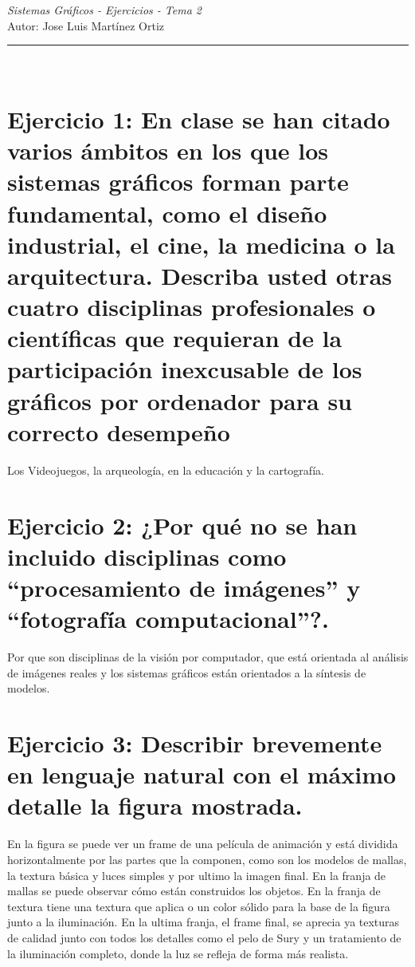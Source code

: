 \documentclass[10pt,a4paper,titlepage]{article}
\date{\normalsize\today} %
\newcommand{\horrule}[1]{\rule{\linewidth}{#1}} %
\begin{document}
\begin{center}
{\Huge \emph{Sistemas Gráficos - Ejercicios - Tema 2} } \\
\vspace{0.5cm}
Autor: Jose Luis Martínez Ortiz\\
\horrule{2pt} \\[0.5cm] %
\vspace{1.5cm}
\end{center}


\date{\normalsize\today} %


\section*{Ejercicio 1: En clase se han citado varios ámbitos en los que los sistemas gráficos forman parte
fundamental, como el diseño industrial, el cine, la medicina o la arquitectura. Describa usted
otras cuatro disciplinas profesionales o científicas que requieran de la participación
inexcusable de los gráficos por ordenador para su correcto desempeño}
Los Videojuegos, la arqueología, en la educación y la cartografía.

\section*{Ejercicio 2: ¿Por qué no se han incluido disciplinas como ``procesamiento de imágenes'' y ``fotografía computacional''?.}
Por que son disciplinas de la visión por computador, que está orientada al análisis de imágenes reales y los sistemas gráficos están orientados a la síntesis de modelos.

\section*{Ejercicio 3: Describir brevemente en lenguaje natural con el máximo detalle la figura mostrada.}
En la figura se puede ver un frame de una película de animación y está dividida horizontalmente por las partes que la componen, como son los modelos de mallas, la textura básica y luces simples y por ultimo la imagen final.
En la franja de mallas se puede observar cómo están construidos los objetos. En la franja de textura tiene una textura que aplica o un color sólido para la base de la figura junto a la iluminación. En la ultima franja, el frame final, se aprecia ya texturas de calidad junto con todos los detalles como el pelo de Sury y un tratamiento de la iluminación completo, donde la luz se refleja de forma más realista.
\end{document}
